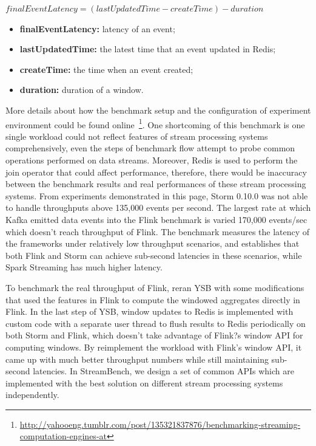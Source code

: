 $finalEventLatency = (lastUpdatedTime - createTime) - duration$

\begin{itemize}
  \item \textbf{finalEventLatency:} latency of an event; 
  \item \textbf{lastUpdatedTime:} the latest time that an event updated in Redis;
  \item \textbf{createTime:} the time when an event created; 
  \item \textbf{duration:} duration of a window.
\end{itemize}

More details about how the benchmark setup and the configuration of experiment environment could be found online~\footnote{\url{http://yahooeng.tumblr.com/post/135321837876/benchmarking-streaming-computation-engines-at}}. One shortcoming of this benchmark is one single workload could not reflect features of stream processing systems comprehensively, even the steps of benchmark flow attempt to probe common operations performed on data streams. Moreover, Redis is used to perform the join operator that could affect performance, therefore, there would be inaccuracy between the benchmark results and real performances of these stream processing systems. From experiments demonstrated in this page, Storm 0.10.0 was not able to handle throughputs above 135,000 events per second. The largest rate at which Kafka emitted data events into the Flink benchmark is varied 170,000 events/sec which doesn't reach throughput of Flink. The benchmark measures the latency of the frameworks under relatively low throughput scenarios, and establishes that both Flink and Storm can achieve sub-second latencies in these scenarios, while Spark Streaming has much higher latency.

To benchmark the real throughput of Flink, \citet{extend-YSB} reran YSB with some modifications that used the features in Flink to compute the windowed aggregates directly in Flink. In the last step of YSB, window updates to Redis is implemented with custom code with a separate user thread to flush results to Redis periodically on both Storm and Flink, which doesn't take advantage of Flink?s window API for computing windows. By reimplement the workload with Flink's window API, it came up with much better throughput numbers while still maintaining sub-second latencies. In StreamBench, we design a set of common APIs which are implemented with the best solution on different stream processing systems independently.
\clearpage




